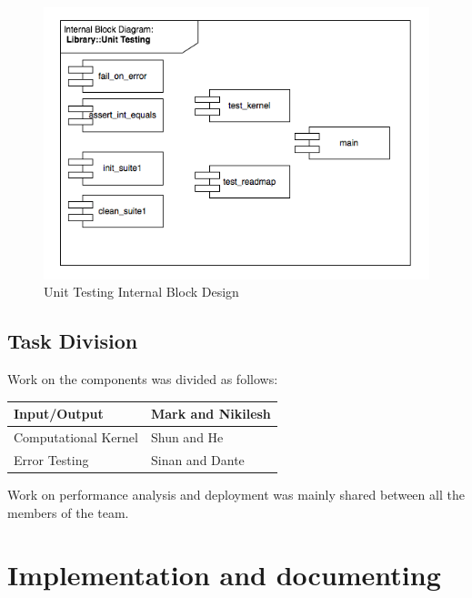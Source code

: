 \documentclass[12pt,a4paper]{article}
\begin{document}
\begin{figure}[hb]
    \centering
    \includegraphics[scale=0.6]{images/bd4.png}
    \caption{Unit Testing Internal Block Design}
\end{figure}

\clearpage


\subsection{Task Division}

Work on the components was divided as follows:

\begin{tabular}{ | l || l | }
    \hline
    Input/Output  & Mark and Nikilesh \\
    \hline
    Computational Kernel & Shun and He \\
    \hline
    Error Testing & Sinan and Dante \\
    \hline
\end{tabular}

Work on performance analysis and deployment was mainly shared between all the members of the team.

%
%
%

\section{Implementation and documenting}
\end{document}

